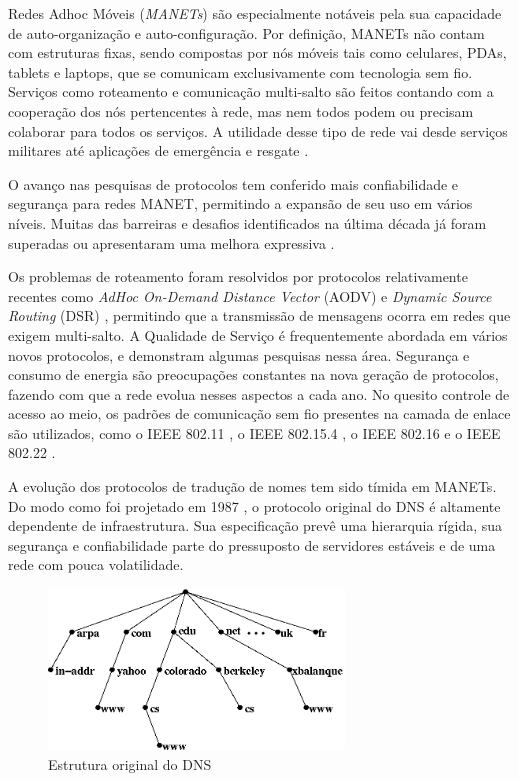 \label{intro}

Redes Adhoc Móveis (\textit{MANETs}) são especialmente notáveis pela sua capacidade
de auto-organização e auto-configuração. Por definição, MANETs não contam com
estruturas fixas, sendo compostas por nós móveis tais como celulares, PDAs,
tablets e laptops, que se comunicam exclusivamente com tecnologia sem fio. Serviços
como roteamento e comunicação multi-salto são feitos contando com a cooperação
dos nós pertencentes à rede, mas nem todos podem ou precisam colaborar para todos
os serviços. A utilidade desse tipo de rede vai desde serviços militares até aplicações
de emergência e resgate \cite{manet-def}.

O avanço nas pesquisas de protocolos tem conferido mais confiabilidade e segurança
para redes MANET, permitindo a expansão de seu uso em vários níveis. Muitas das
barreiras e desafios identificados na última década já foram superadas ou apresentaram
uma melhora expressiva \cite{manet-state}.

Os problemas de roteamento foram resolvidos por protocolos relativamente recentes
como \textit{AdHoc On-Demand Distance Vector} (AODV) \cite{aodv} e
\textit{Dynamic Source Routing} (DSR) \cite{dsr}, permitindo que a transmissão de
mensagens ocorra em redes que exigem multi-salto. A Qualidade de Serviço é
frequentemente abordada em vários novos protocolos, \cite{qos1} e \cite{qos2}
demonstram algumas pesquisas nessa área. Segurança e consumo de energia são
preocupações constantes na nova geração de protocolos, fazendo com que a rede
evolua nesses aspectos a cada ano. No quesito controle de acesso ao meio, os
padrões de comunicação sem fio presentes na camada de enlace são utilizados,
como o IEEE 802.11 \cite{802-11}, o IEEE 802.15.4 \cite{802-15}, o IEEE 802.16
\cite{802-16} e o IEEE 802.22 \cite{802-22}.

A evolução dos protocolos de tradução de nomes tem sido tímida em MANETs. Do
modo como foi projetado em 1987 \cite{rfc1035}, o protocolo original do DNS é
altamente dependente de infraestrutura. Sua especificação prevê uma hierarquia rígida,
sua segurança e confiabilidade parte do pressuposto de servidores estáveis e de
uma rede com pouca volatilidade.

\begin{figure}[h!]
    \centering
    \includegraphics[width=0.7\textwidth]{figures/dns-1}
    \caption{Estrutura original do DNS}
    \label{dns}
\end{figure}

